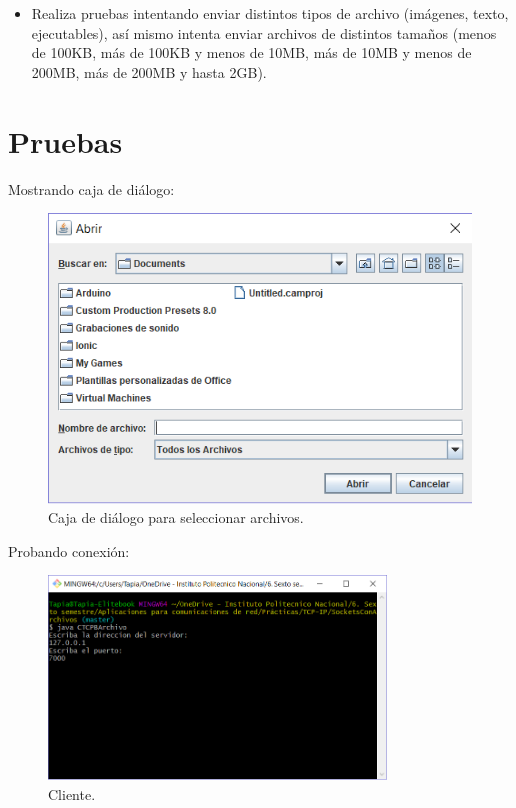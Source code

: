 \documentclass[12pt,twoside]{article}
\begin{document}
\begin{itemize}
    \item Realiza pruebas intentando enviar distintos tipos de archivo (im\'agenes, texto, ejecutables), as\'i mismo intenta enviar archivos de distintos tama\~nos (menos de 100KB, m\'as de 100KB y menos de 10MB, m\'as de 10MB y
menos de 200MB, m\'as de 200MB y hasta 2GB).


\end{itemize}




\section{Pruebas}
Mostrando caja de di\'alogo:
\begin{figure}[h]
	\centering
	\includegraphics[width=1\textwidth]{img/JFChooser.png}
	\caption{Caja de di\'alogo para seleccionar archivos.}
\end{figure}

\newpage

Probando conexi\'on:
\begin{figure}[h]
	\centering
	\includegraphics[width=0.8\textwidth]{img/Cliente.png}
	\caption{Cliente.}
\end{figure}
\end{document}
